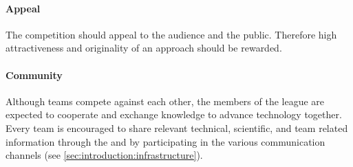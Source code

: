 \paragraph{Appeal}
\label{sec:concepts:appel}
The competition should appeal to the audience and the public. Therefore high attractiveness and originality of an approach should be rewarded.

\paragraph{Community}
\label{sec:concepts:community}
Although teams compete against each other, the members of the \AtHome{} league are expected to cooperate and exchange knowledge to advance technology together. Every team is encouraged to share relevant technical, scientific, and team related information through the \TDP{} and by participating in the various communication channels (see \ref{sec:introduction:infrastructure}).


